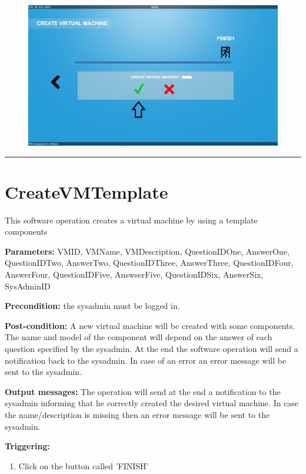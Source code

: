 \begin{figure}[H]
\centering
\includegraphics[width=170mm]{images/createVMEx10.eps}
\caption{\label{overflow}}
\end{figure}


\hrule
\vspace{0.5cm}



\section{CreateVMTemplate}
\label{operation:CreateVMTemplate}
This software operation creates a virtual machine by using a template
components
\begin{description}

\item \textbf{Parameters:} VMID, VMName, VMDescription, QuestionIDOne,
AnswerOne, QuestionIDTwo, AnswerTwo, QuestionIDThree, AnswerThree,
QuestionIDFour, AnswerFour, QuestionIDFive, AnswserFive, QuestionIDSix,
AnswerSix, SysAdminID
\item \textbf{Precondition:} the sysadmin must be logged in.
\item \textbf{Post-condition:} A new virtual machine will be created with some
components. The name and model of the component will depend on the answer of
each question specified by the sysadmin. At the end the software operation will
send a notification back to the sysadmin. In case of an error an error message
will be sent to the sysadmin.
\item \textbf{Output messages:} The operation will send at the end a
notification to the sysadmin informing that he correctly created the desired
virtual machine. In case the name/description is missing then an error message
will be sent to the sysadmin.

\item \textbf{Triggering:}
\begin{enumerate}
\item Click on the button called 'FINISH'
\end{enumerate}

 
\end{description}

